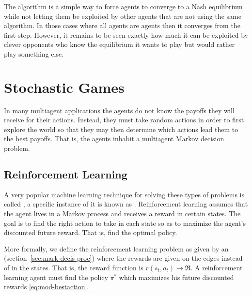The  algorithm is a simple way to force agents to
converge to a Nash equilibrium while not letting them be exploited by
other agents that are not using the same algorithm. In those cases
where all agents are  agents then it converges from the
first step. However, it remains to be seen exactly how much it can be
exploited by clever opponents who know the equilibrium it wants to
play but would rather play something else.

\section{Stochastic Games}

In many multiagent applications the agents do not know the payoffs
they will receive for their actions. Instead, they must take random
actions in order to first explore the world so that they may then
determine which actions lead them to the best payoffs. That is, the
agents inhabit a multiagent Markov decision problem.


\subsection{Reinforcement Learning}
\label{sec:reinf-learn}

A very popular machine learning technique for solving these types of
problems is called  \cite{sutton98a}, a
specific instance of it is known as  \cite{watkins92a}.
Reinforcement learning assumes that the agent lives in a Markov
process and receives a reward in certain states. The goal is to find
the right action to take in each state so as to maximize the agent's
discounted future reward. That is, find the optimal policy.

More formally, we define the reinforcement learning problem as given
by an  (section~\ref{sec:mark-decis-proc}) where the rewards
are given on the edges instead of in the states. That is, the reward
function is $r(s_t,a_t) \rightarrow \Re$. A reinforcement learning
agent must find the policy $\pi^*$ which maximizes his future
discounted rewards \eqref{eq:mod-bestaction}.

